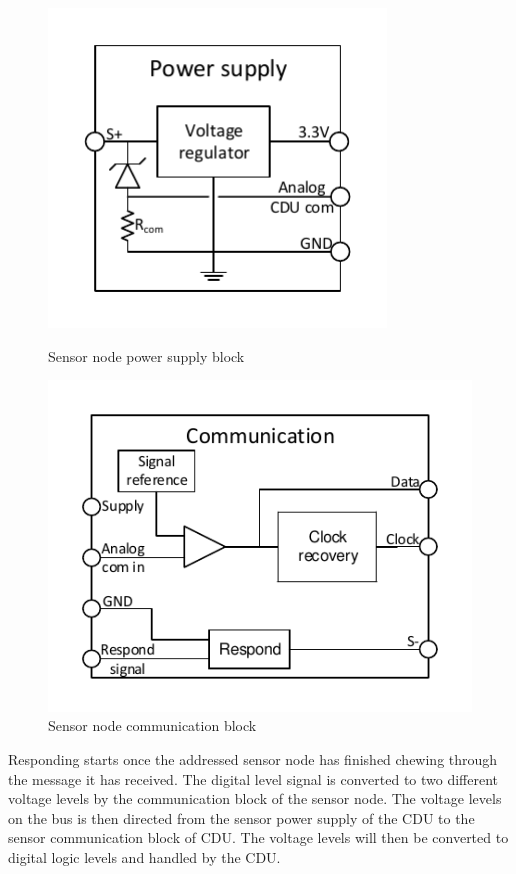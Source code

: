 \begin{figure}[htbp]
	\begin{minipage}[b]{0.45\linewidth}
	\centering
	\includegraphics[width=0.8\textwidth]{billeder/11ProjectDescription/powersupply_detailed_sn}
	\caption{Sensor node power supply block}
	\label{fig:SN_PS_FIGURE}
	\end{minipage}
	\begin{minipage}[b]{0.45\linewidth}
	\centering
	\includegraphics[width=1\textwidth]{billeder/11ProjectDescription/communication_sn}
	\caption{Sensor node communication block}
	\label{fig:SN_com_fig}
	\end{minipage}
\end{figure} 
Responding starts once the addressed sensor node has finished chewing through the message it has received. The digital level signal is converted to two different voltage levels by the communication block of the sensor node. The voltage levels on the bus is then directed from the sensor power supply of the CDU to the sensor communication block of CDU. The voltage levels will then be converted to digital logic levels and handled by the CDU.

